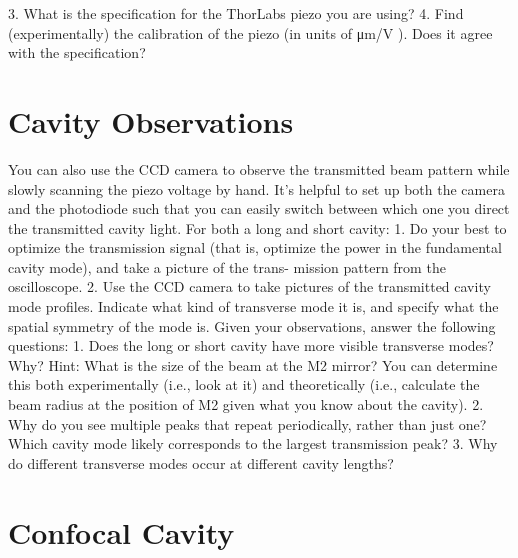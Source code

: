 \documentclass[11pt]{article}
\begin{document}
3. What is the specification for the ThorLabs piezo you are using?
4. Find (experimentally) the calibration of the piezo (in units of μm/V ). Does it agree with the specification?

\section{Cavity Observations}

You can also use the CCD camera to observe the transmitted beam pattern while slowly scanning the piezo voltage by hand. It’s helpful to set up both the camera and the photodiode such that you can easily switch between which one you direct the transmitted cavity light. For both a long and short cavity:
1. Do your best to optimize the transmission signal (that is, optimize the power in the fundamental cavity mode), and take a picture of the trans- mission pattern from the oscilloscope.
2. Use the CCD camera to take pictures of the transmitted cavity mode profiles. Indicate what kind of transverse mode it is, and specify what the spatial symmetry of the mode is.
Given your observations, answer the following questions:
1. Does the long or short cavity have more visible transverse modes? Why? Hint: What is the size of the beam at the M2 mirror? You can determine this both experimentally (i.e., look at it) and theoretically (i.e., calculate the beam radius at the position of M2 given what you know about the cavity).
2. Why do you see multiple peaks that repeat periodically, rather than just one? Which cavity mode likely corresponds to the largest transmission peak?
3. Why do different transverse modes occur at different cavity lengths?

\section{Confocal Cavity}
\end{document}
